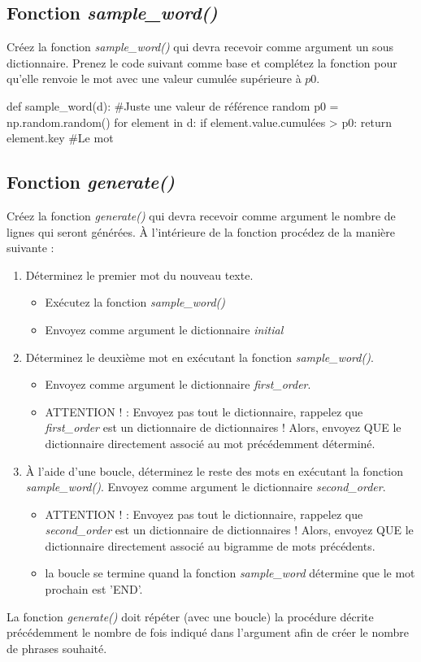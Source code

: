 \subsection{Fonction \textit{sample\_word()}}
Créez la fonction \textit{sample\_word()} qui devra recevoir comme argument un sous dictionnaire. Prenez le code suivant comme base et complétez la fonction pour qu'elle renvoie le mot avec une valeur cumulée supérieure à $p0$.

\begin{python}
def sample_word(d):
 #Juste une valeur de référence random
 p0 = np.random.random()
 for element in d:
  if element.value.cumulées > p0:
   return element.key #Le mot
\end{python}

\subsection{Fonction \textit{generate()}}
Créez la fonction \textit{generate()} qui devra recevoir comme argument le nombre de lignes qui seront générées. À l’intérieure de la fonction procédez de la manière suivante :

\begin{enumerate}
	\item Déterminez le premier mot du nouveau texte.
	\begin{itemize}
		\item Exécutez la fonction \textit{sample\_word()}
		\item Envoyez comme argument le dictionnaire \textit{initial}
	\end{itemize}
	 
	\item Déterminez le deuxième mot en exécutant la fonction \textit{sample\_word()}. 
	\begin{itemize}
		\item Envoyez comme argument le dictionnaire \textit{first\_order}.
		\item ATTENTION ! : Envoyez pas tout le dictionnaire, rappelez que \textit{first\_order} est un dictionnaire de dictionnaires ! Alors, envoyez QUE le dictionnaire directement associé au mot précédemment déterminé.
	\end{itemize}
	\item À l'aide d'une boucle, déterminez le reste des mots en exécutant la fonction \textit{sample\_word()}. Envoyez comme argument le dictionnaire \textit{second\_order}.
	\begin{itemize}
		\item ATTENTION ! : Envoyez pas tout le dictionnaire, rappelez que \textit{second\_order} est un dictionnaire de dictionnaires ! Alors, envoyez QUE le dictionnaire directement associé au bigramme de mots précédents.
		\item la boucle se termine quand la fonction \textit{sample\_word} détermine que le mot prochain est 'END'.
	\end{itemize}
\end{enumerate}

La fonction \textit{generate()} doit répéter (avec une boucle) la procédure décrite précédemment le nombre de fois indiqué dans l'argument afin de créer le nombre de phrases souhaité.
